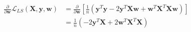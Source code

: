 \newcommand{\matrix}[1]{\mathbf{#1}}
\newcommand{\vector}[1]{\mathbf{#1}}
\newcommand{\X}{\matrix{X}}
\newcommand{\y}{\vector{y}}
\newcommand{\w}{\vector{w}}
\begin{align*}
\frac{\partial}{\partial \w} \mathcal{L}_{LS} (\X,\y,\w) &= \frac{\partial}{\partial \w} \left[ \frac{1}{n} \left( \y^T\y - 2\y^T\X\w + \w^T\X^T\X\w \right) \right] \\
&= \frac{1}{n} (-2\y^T\X + 2\w^T\X^T\X) \\
\end{align*}
